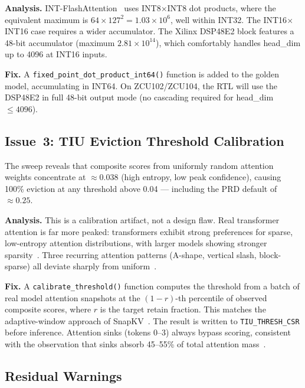 \documentclass[conference]{IEEEtran}
\begin{document}
\textbf{Analysis.} INT-FlashAttention~\cite{intflashattention2024}
uses INT8$\times$INT8 dot products, where the equivalent maximum is
$64 \times 127^2 = 1.03\times 10^6$, well within INT32. The
INT16$\times$INT16 case requires a wider accumulator. The Xilinx
DSP48E2 block features a 48-bit accumulator (maximum
$2.81\times 10^{14}$), which comfortably handles head\_dim up to
4096 at INT16 inputs.

\textbf{Fix.} A \texttt{fixed\_point\_dot\_product\_int64()} function
is added to the golden model, accumulating in INT64. On ZCU102/ZCU104,
the RTL will use the DSP48E2 in full 48-bit output mode (no cascading
required for head\_dim $\le 4096$).

\subsection{Issue~3: TIU Eviction Threshold Calibration}

The sweep reveals that composite scores from uniformly random
attention weights concentrate at ${\approx}0.038$ (high entropy,
low peak confidence), causing 100\% eviction at any threshold above
0.04 --- including the PRD default of ${\approx}0.25$.

\textbf{Analysis.} This is a calibration artifact, not a design
flaw. Real transformer attention is far more peaked: transformers
exhibit strong preferences for sparse, low-entropy attention
distributions, with larger models showing stronger sparsity~\cite{lowentropy2025}.
Three recurring attention patterns (A-shape, vertical slash,
block-sparse) all deviate sharply from uniform~\cite{sparsefrontier2025}.

\textbf{Fix.} A \texttt{calibrate\_threshold()} function computes
the threshold from a batch of real model attention snapshots at the
$(1-r)$-th percentile of observed composite scores, where $r$ is
the target retain fraction. This matches the adaptive-window approach
of SnapKV~\cite{snapkv2024}. The result is written to
\texttt{TIU\_THRESH\_CSR} before inference. Attention sinks
(tokens 0--3) always bypass scoring, consistent with the observation
that sinks absorb 45--55\% of total attention mass~\cite{streamingllm2023}.

\subsection{Residual Warnings}
\end{document}
